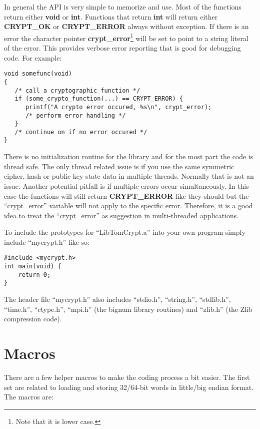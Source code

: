 \documentclass{book}
\begin{document}
In general the API is very simple to memorize and use.  Most of the functions return either {\bf void} or {\bf int}.  Functions
that return {\bf int} will return either {\bf CRYPT\_OK} or {\bf CRYPT\_ERROR} always without exception.  If there is an
error the character pointer {\bf crypt\_error}\footnote{Note that it is lower case.} will be set to point to a string
literal of the error.  This provides verbose error reporting that is good for debugging code.  For example:
\begin{verbatim}
void somefunc(void)
{
   /* call a cryptographic function */
   if (some_crypto_function(...) == CRYPT_ERROR) {
      printf("A crypto error occured, %s\n", crypt_error);
      /* perform error handling */
   }
   /* continue on if no error occured */
}
\end{verbatim}

There is no initialization routine for the library and for the most part the code is thread safe.  The only thread
related issue is if you use the same symmetric cipher, hash or public key state data in multiple threads.  Normally
that is not an issue.  Another potential pitfall is if multiple errors occur
simultaneously.  In this case the functions will still return {\bf CRYPT\_ERROR} like they should but the ``crypt\_error''
variable will not apply to the specific error.  Therefore, it is a good idea to treat the ``crypt\_error'' as suggestion
in multi-threaded applications.

To include the prototypes for ``LibTomCrypt.a'' into your own program simply include ``mycrypt.h'' like so:
\begin{verbatim}
#include <mycrypt.h>
int main(void) {
    return 0;
}
\end{verbatim}

The header file ``mycrypt.h'' also includes ``stdio.h'', ``string.h'', ``stdlib.h'', ``time.h'', ``ctype.h'', ``mpi.h''
(the bignum library routines) and ``zlib.h'' (the Zlib compression code).

\section{Macros}

There are a few helper macros to make the coding process a bit easier.  The first set are related to loading and storing
32/64-bit words in little/big endian format.  The macros are:
\end{document}
